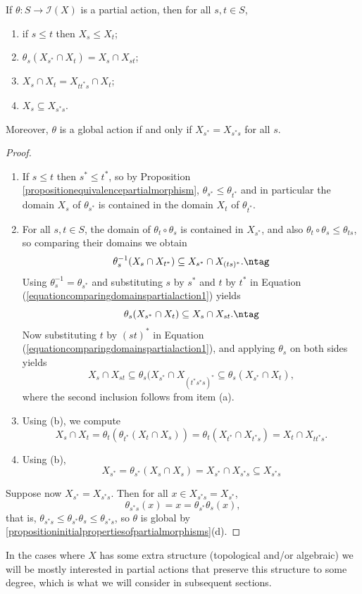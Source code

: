 \begin{proposition}\label{propositioncomparingdomainspartialaction}
If $\theta:S\to\mathcal{I}(X)$ is a partial action, then for all $s,t\in S$,
\begin{enumerate}
\item[(a)] if $s\leq t$ then $X_s\leq X_t$;
\item[(b)] $\theta_s(X_{s^*}\cap X_t)=X_s\cap X_{st}$;
\item[(c)] $X_s\cap X_t=X_{tt^*s}\cap X_t$;
\item[(d)] $X_s\subseteq X_{s^*s}$.
\end{enumerate}
Moreover, $\theta$ is a global action if and only if $X_{s^*}=X_{s^*s}$ for all $s$.
\end{proposition}
\begin{proof}
\begin{enumerate}
\item[(a)] If $s\leq t$ then $s^*\leq t^*$, so by Proposition \ref{propositionequivalencepartialmorphism}, $\theta_{s^*}\leq\theta_{t^*}$ and in particular the domain $X_s$ of $\theta_{s^*}$ is contained in the domain $X_t$ of $\theta_{t^*}$.
\item[(b)] For all $s,t\in S$, the domain of $\theta_t\circ\theta_s$ is contained in $X_{s^*}$, and also $\theta_t\circ\theta_s\leq\theta_{ts}$, so comparing their domains we obtain
\[\theta_s^{-1}(X_s\cap X_{t^*})\subseteq X_{s^*}\cap X_{(ts)^*}.\ntag\label{equationcomparingdomainspartialaction1}\]
Using $\theta_s^{-1}=\theta_{s^*}$ and substituting $s$ by $s^*$ and $t$ by $t^*$ in Equation (\ref{equationcomparingdomainspartialaction1}) yields
\[\theta_s(X_{s^*}\cap X_t)\subseteq X_{s}\cap X_{st}.\ntag\label{equationcomparingdomainspartialaction2}\]
Now substituting $t$ by $(st)^*$ in Equation (\ref{equationcomparingdomainspartialaction1}), and applying $\theta_s$ on both sides yields
\[X_s\cap X_{st}\subseteq\theta_s(X_{s^*}\cap X_{(t^*s^*s)^*}\subseteq\theta_s(X_{s^*}\cap X_t),\]
where the second inclusion follows from item (a).
\item[(c)] Using (b), we compute
\[X_s\cap X_t=\theta_t(\theta_{t^*}(X_t\cap X_s))=\theta_t(X_{t^*}\cap X_{t^*s})=X_t\cap X_{tt^*s}.\]
\item[(d)] Using (b),
\[X_{s^*}=\theta_{s^*}(X_s\cap X_s)=X_{s^*}\cap X_{s^*s}\subseteq X_{s^*s}\]
\end{enumerate}
Suppose now $X_{s^*}=X_{s^*s}$. Then for all $x\in X_{s^*s}=X_{s^*}$,
\[\theta_{s^*s}(x)=x=\theta_{s^*}\theta_s(x),\]
that is, $\theta_{s^*s}\leq \theta_{s^*}\theta_s\leq\theta_{s^*s}$, so $\theta$ is global by \ref{propositioninitialpropertiesofpartialmorphisms}(d).\qedhere
\end{proof}

In the cases where $X$ has some extra structure (topological and/or algebraic) we will be mostly interested in partial actions that preserve this structure to some degree, which is what we will consider in subsequent sections.